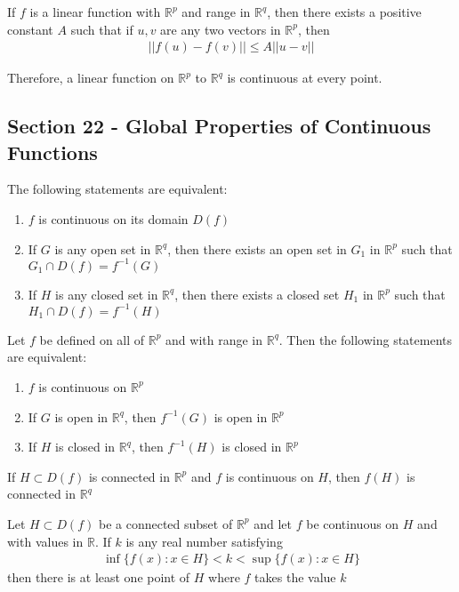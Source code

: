 \documentclass[12pt]{article}
\newcommand{\R}{\mathbb{R}}
\newenvironment{theorem}[2][Theorem]{\begin{trivlist}
\item[\hskip \labelsep {\bfseries #1}\hskip \labelsep {\bfseries #2.}]}{\end{trivlist}}
\newenvironment{corollary}[2][Corollary]{\begin{trivlist}
\item[\hskip \labelsep {\bfseries #1}\hskip \labelsep {\bfseries #2.}]}{\end{trivlist}}
\begin{document}
\begin{theorem}{21.3}
If $f$ is a linear function with $\R^p$ and range in $\R^q$, then there exists a positive constant $A$ such that if $u, v$ are any two vectors in $\R^p$, then
\begin{align*}
||f(u) - f(v)|| \leq A ||u - v||
\end{align*}

Therefore, a linear function on $\R^p$ to $\R^q$ is continuous at every point.
\end{theorem}

\subsection*{Section 22 - Global Properties of Continuous Functions}

\begin{theorem}[Global Continuity]{Theorem}
The following statements are equivalent:
\begin{enumerate}[label=\alph*)]
\item $f$ is continuous on its domain $D(f)$
\item If $G$ is any open set in $\R^q$, then there exists an open set in $G_1$ in $\R^p$ such that $G_1 \cap D(f) = f^{-1}(G)$
\item If $H$ is any closed set in $\R^q$, then there exists a closed set $H_1$ in $\R^p$ such that $H_1 \cap D(f) = f^{-1}(H)$
\end{enumerate}
\end{theorem}

\begin{corollary}{22.2}
Let $f$ be defined on all of $\R^p$ and with range in $\R^q$. Then the following statements are equivalent:
\begin{enumerate}[label=\alph*)]
\item $f$ is continuous on $\R^p$
\item If $G$ is open in $\R^q$, then $f^{-1}(G)$ is open in $\R^p$
\item If $H$ is closed in $\R^q$, then $f^{-1}(H)$ is closed in $\R^p$
\end{enumerate}
\end{corollary}

\begin{theorem}[Preservation of]{Connectedness}
If $H \subset D(f)$ is connected in $\R^p$ and $f$ is continuous on $H$, then $f(H)$ is connected in $\R^q$
\end{theorem}

\begin{theorem}[Bolzano's Intermediate Value]{Theorem}
Let $H \subset D(f)$ be a connected subset of $\R^p$ and let $f$ be continuous on $H$ and with values in $\R$. If $k$ is any real number satisfying
\begin{align*}
\inf \{f(x): x \in H\} < k < \sup \{f(x): x \in H\}
\end{align*}
then there is at least one point of $H$ where $f$ takes the value $k$
\end{theorem}
\end{document}
